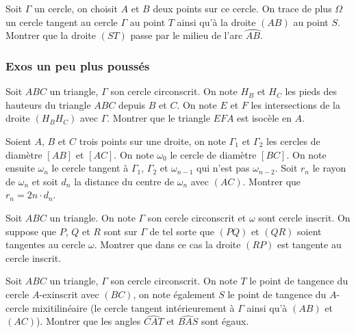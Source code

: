 \begin{exo}
Soit $\Gamma$ un cercle, on choisit $A$ et $B$ deux points sur ce cercle. On trace de plus $\Omega$ un cercle tangent au cercle $\Gamma$ au point $T$ ainsi qu'à la droite $(AB)$ au point $S$. Montrer que la droite $(ST)$ passe par le milieu de l'arc $\wideparen{AB}$.
\end{exo}


\subsubsection{Exos un peu plus poussés}


\begin{exo}
Soit $ABC$ un triangle, $\Gamma$ son cercle circonscrit. On note $H_B$ et $H_C$ les pieds des hauteurs du triangle $ABC$ depuis $B$ et $C$. On note $E$ et $F$ les intersections de la droite $(H_BH_C)$ avec $\Gamma$. Montrer que le triangle $EFA$ est isocèle en $A$.
\end{exo}

\begin{exo}
Soient $A$, $B$ et $C$ trois points sur une droite, on note $\Gamma_1$ et $\Gamma_2$ les cercles de diamètre $[AB]$ et $[AC]$. On note $\omega_0$ le cercle de diamètre $[BC]$. On note ensuite $\omega_n$ le cercle tangent à $\Gamma_1$, $\Gamma_2$ et $\omega_{n-1}$ qui n'est pas $\omega_{n-2}$. Soit $r_n$ le rayon de $\omega_n$ et soit $d_n$ la distance du centre de $\omega_n$ avec $(AC)$. Montrer que $r_n=2n \cdot d_n$.
\end{exo}

\begin{exo}
Soit $ABC$ un triangle. On note $\Gamma$ son cercle circonscrit et $\omega$ sont cercle inscrit. On suppose que $P$, $Q$ et $R$ sont sur $\Gamma$ de tel sorte que $(PQ)$ et $(QR)$ soient tangentes au cercle $\omega$. Montrer que dans ce cas la droite $(RP)$ est tangente au cercle inscrit.
\end{exo}

\begin{exo}
Soit $ABC$ un triangle, $\Gamma$ son cercle circonscrit. On note $T$ le point de tangence du cercle $A$-exinscrit avec $(BC)$, on note également $S$ le point de tangence du $A$-cercle mixitilinéaire (le cercle tangent intérieurement à $\Gamma$ ainsi qu'à $(AB)$ et $(AC)$). Montrer que les angles $\widehat{CAT}$ et $\widehat{BAS}$ sont égaux.
\end{exo}


